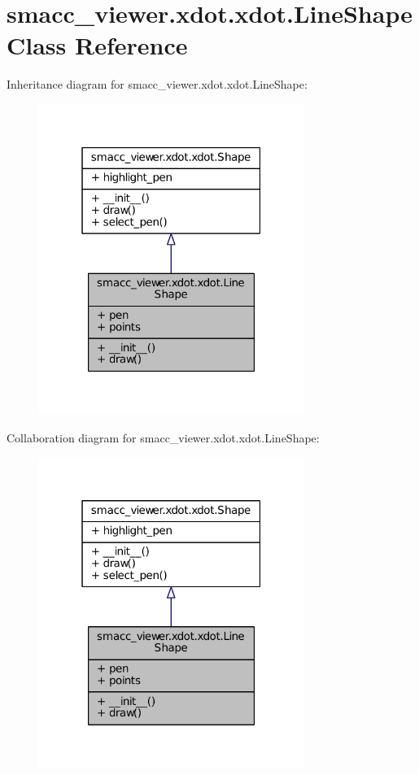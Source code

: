 \hypertarget{classsmacc__viewer_1_1xdot_1_1xdot_1_1LineShape}{}\section{smacc\+\_\+viewer.\+xdot.\+xdot.\+Line\+Shape Class Reference}
\label{classsmacc__viewer_1_1xdot_1_1xdot_1_1LineShape}


Inheritance diagram for smacc\+\_\+viewer.\+xdot.\+xdot.\+Line\+Shape\+:
\nopagebreak
\begin{figure}[H]
\begin{center}
\leavevmode
\includegraphics[width=244pt]{classsmacc__viewer_1_1xdot_1_1xdot_1_1LineShape__inherit__graph}
\end{center}
\end{figure}


Collaboration diagram for smacc\+\_\+viewer.\+xdot.\+xdot.\+Line\+Shape\+:
\nopagebreak
\begin{figure}[H]
\begin{center}
\leavevmode
\includegraphics[width=244pt]{classsmacc__viewer_1_1xdot_1_1xdot_1_1LineShape__coll__graph}
\end{center}
\end{figure}
